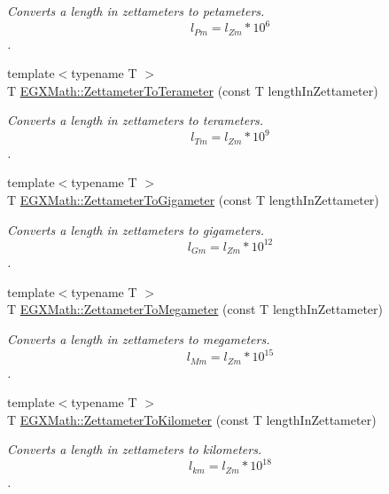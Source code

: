 \begin{DoxyCompactItemize}
\begin{DoxyCompactList}\small\item\em Converts a length in zettameters to petameters. \[ l_{Pm}=l_{Zm} * 10^{6} \]. \end{DoxyCompactList}\item 
{\footnotesize template$<$typename T $>$ }\\T \mbox{\hyperlink{group___e_g_x_math-_conversions-_length_conversions-_s_i-_zettameter-_s_i_ga16dfe32824b09a16e5af4a6f663c0f38}{E\+G\+X\+Math\+::\+Zettameter\+To\+Terameter}} (const T length\+In\+Zettameter)
\begin{DoxyCompactList}\small\item\em Converts a length in zettameters to terameters. \[ l_{Tm}=l_{Zm} * 10^{9} \]. \end{DoxyCompactList}\item 
{\footnotesize template$<$typename T $>$ }\\T \mbox{\hyperlink{group___e_g_x_math-_conversions-_length_conversions-_s_i-_zettameter-_s_i_gab6673b4fa72a1c196d7fba1260e7f78a}{E\+G\+X\+Math\+::\+Zettameter\+To\+Gigameter}} (const T length\+In\+Zettameter)
\begin{DoxyCompactList}\small\item\em Converts a length in zettameters to gigameters. \[ l_{Gm}=l_{Zm} * 10^{12} \]. \end{DoxyCompactList}\item 
{\footnotesize template$<$typename T $>$ }\\T \mbox{\hyperlink{group___e_g_x_math-_conversions-_length_conversions-_s_i-_zettameter-_s_i_gaf29478b073f568afbf9c70b3c2eb94e4}{E\+G\+X\+Math\+::\+Zettameter\+To\+Megameter}} (const T length\+In\+Zettameter)
\begin{DoxyCompactList}\small\item\em Converts a length in zettameters to megameters. \[ l_{Mm}=l_{Zm} * 10^{15} \]. \end{DoxyCompactList}\item 
{\footnotesize template$<$typename T $>$ }\\T \mbox{\hyperlink{group___e_g_x_math-_conversions-_length_conversions-_s_i-_zettameter-_s_i_ga99d03473393cdeeeca462cdd0928c9d9}{E\+G\+X\+Math\+::\+Zettameter\+To\+Kilometer}} (const T length\+In\+Zettameter)
\begin{DoxyCompactList}\small\item\em Converts a length in zettameters to kilometers. \[ l_{km}=l_{Zm} * 10^{18} \]. \end{DoxyCompactList}\item 

\end{DoxyCompactItemize}
